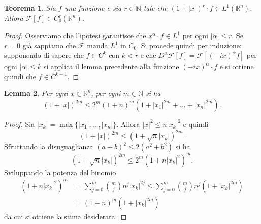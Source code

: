 \documentclass[italian,a4paper,oneside,headinclude]{scrbook}
\newcommand{\F}{\mathcal F}
\newcommand{\NN}{\mathbb N}
\newcommand{\RR}{\mathbb R}
\newcommand{\abs}[1]{{\left|#1\right|}}
\newtheorem{theorem}{Teorema}
\newtheorem{lemma}[theorem]{Lemma}
\begin{document}
  \begin{theorem}
    Sia $f$ una funzione e sia $r\in \NN$
    tale che
    $(1+\abs{x})^r  \cdot f \in L^1(\RR^n)$.
    Allora $\F[f]\in C^r_0(\RR^n)$.
  \end{theorem}
  \begin{proof}
    Osserviamo che l'ipotesi garantisce che $x^{\alpha} \cdot f \in L^1$
    per ogni $\abs{\alpha}\le r$. Se $r=0$ già sappiamo che $\F$ manda
    $L^1$ in $C_0$. Si procede quindi per induzione: supponendo di
    sapere che $f\in C^k$ con $k<r$ e che
    $D^\alpha \F[f] = \F[(-ix)^\alpha f]$ per ogni $\abs{\alpha}\le k$
    si applica il lemma precedente alla funzione $(-ix)^\alpha \cdot f$ e si
    ottiene quindi che $f\in C^{k+1}$.
  \end{proof}

  \begin{lemma}
    Per ogni $x \in \RR^n$, per ogni $m\in \NN$ si ha
    \[
    (1+\abs{x})^{2m} \le 2^m(1+n)^m (1+\abs{x_1}^{2m}+ \dots + \abs{x_n}^{2m}).
    \]
  \end{lemma}
  \begin{proof}
    Sia $\abs{x_k} = \max\{\abs{x_1},\dots,\abs{x_n}\}$.
    Allora $\abs{x}^2 \le n \abs{x_k}^2$ e quindi
    \[
    (1+\abs{x})^{2m} \le (1+\sqrt n \abs{x_k})^{2m}.
    \]
    Sfruttando la disuguaglianza $(a+b)^2 \le 2(a^2+b^2)$ si ha
    \[
    (1+\sqrt n \abs{x_k})^{2m}
    \le 2^m(1 + n \abs{x_k}^2)^m.
    \]
    Sviluppando la potenza del binomio
    \begin{align*}
      (1+n \abs{x_k}^2)^m
      &= \sum_{j=0}^m {m \choose j} n^j\abs{x_k}^{2j}
      \le \sum_{j=0}^m {m \choose j} n^j (1+\abs{x_k}^{2m}) \\
      & = (1+n)^m (1+\abs{x_k}^{2m})
    \end{align*}
    da cui si ottiene la stima desiderata.
  \end{proof}
\end{document}
